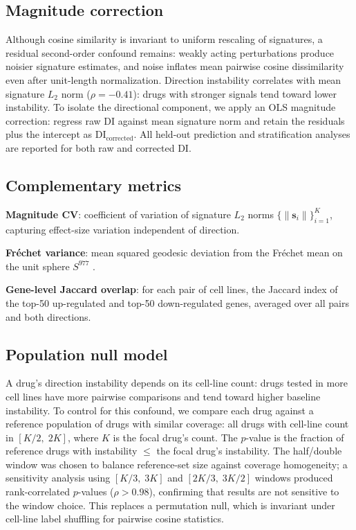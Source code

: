 \documentclass[11pt]{article}
\begin{document}
\subsection{Magnitude correction}

Although cosine similarity is invariant to uniform rescaling of
signatures, a residual second-order confound remains: weakly acting
perturbations produce noisier signature estimates, and noise inflates
mean pairwise cosine dissimilarity even after unit-length normalization.
Direction instability correlates with mean signature $L_2$ norm
($\rho = -0.41$): drugs with stronger signals tend toward lower
instability.  To isolate the directional component, we apply an OLS
magnitude correction: regress raw DI against mean signature norm and
retain the residuals plus the intercept as
$\text{DI}_{\text{corrected}}$.  All held-out prediction and
stratification analyses are reported for both raw and corrected DI.

\subsection{Complementary metrics}

\textbf{Magnitude CV}: coefficient of variation of signature $L_2$ norms
$\{\|\mathbf{s}_i\|\}_{i=1}^K$, capturing effect-size variation independent
of direction.

\textbf{Fr\'echet variance}: mean squared geodesic deviation from the
Fr\'echet mean on the unit sphere $S^{977}$
\citep{pennec2006intrinsic}.

\textbf{Gene-level Jaccard overlap}: for each pair of cell lines, the
Jaccard index of the top-50 up-regulated and top-50 down-regulated genes,
averaged over all pairs and both directions.

\subsection{Population null model}

A drug's direction instability depends on its cell-line count: drugs tested
in more cell lines have more pairwise comparisons and tend toward higher
baseline instability.  To control for this confound, we compare each drug
against a reference population of drugs with similar coverage: all drugs
with cell-line count in $[K/2,\; 2K]$, where $K$ is the focal drug's count.
The $p$-value is the fraction of reference drugs with instability $\leq$
the focal drug's instability.  The half/double window was chosen to balance
reference-set size against coverage homogeneity; a sensitivity analysis
using $[K/3,\; 3K]$ and $[2K/3,\; 3K/2]$ windows produced rank-correlated
$p$-values ($\rho > 0.98$), confirming that results are not sensitive to
the window choice.  This replaces a permutation null, which is invariant
under cell-line label shuffling for pairwise cosine statistics.
\end{document}
